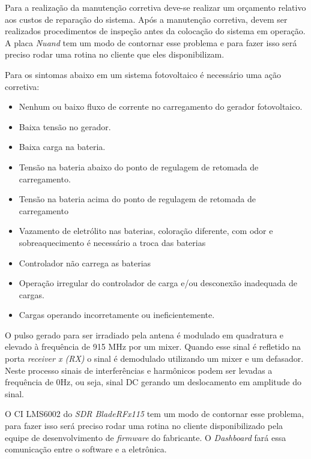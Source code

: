 Para a realização da manutenção corretiva deve-se realizar um orçamento relativo aos custos de reparação do sistema. Após a manutenção corretiva, devem ser realizados procedimentos de inspeção antes da colocação do sistema em operação.
A placa \textit{Nuand} tem um modo de contornar esse problema e para fazer isso será preciso rodar uma rotina no cliente que eles disponibilizam. 

Para os sintomas abaixo em um sistema fotovoltaico é necessário uma ação corretiva:
\begin{itemize}
    \item Nenhum ou baixo fluxo de corrente no carregamento do gerador fotovoltaico.
    \item Baixa tensão no gerador.
    \item Baixa carga na bateria.
    \item Tensão na bateria abaixo do ponto de regulagem de retomada de carregamento.
    \item Tensão na bateria acima do ponto de regulagem de retomada de carregamento
    \item Vazamento de eletrólito nas baterias, coloração diferente, com odor e
sobreaquecimento é necessário a troca das baterias
    \item Controlador não carrega as baterias
    \item Operação irregular do controlador de carga e/ou desconexão inadequada de cargas.
    \item Cargas operando incorretamente ou ineficientemente. 
\end{itemize}


O pulso gerado para ser irradiado pela antena é modulado em quadratura e elevado à frequência de 915 MHz por um mixer. Quando esse sinal é refletido na porta \emph{receiver x (RX)} o sinal é demodulado utilizando um mixer e um defasador. Neste processo sinais de interferências e harmônicos podem ser levadas a frequência de 0Hz, ou seja, sinal DC gerando um deslocamento em amplitude do sinal.

O CI LMS6002 do \textit{SDR BladeRFx115} tem um modo de contornar esse problema, para fazer isso será preciso rodar uma rotina no cliente  disponibilizado pela equipe de desenvolvimento de \emph{firmware} do fabricante. O  \textit{Dashboard} fará essa comunicação entre o software e a eletrônica. 

